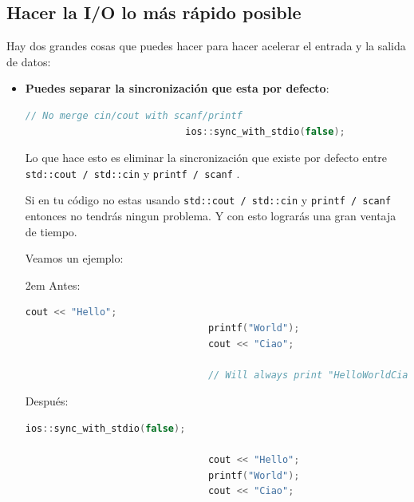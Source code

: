 \documentclass[12pt, fleqn]{report}                             %
\newenvironment{Indentation}[1][0.75em]                         %
        {\begin{adjustwidth}{#1}{}}                                 %
        {\end{adjustwidth}}                                         %
\theoremstyle{break}                                            %
\newcommand{\textCode}[1]  { \texttt{#1} }                      %
\begin{document}
            \subsection{Hacer la I/O lo más rápido posible}

                Hay dos grandes cosas que puedes hacer para hacer acelerar el entrada y la salida
                de datos:
                \begin{itemize}
                    \item \textbf{Puedes separar la sincronización que esta por defecto}:
                        \begin{lstlisting}[language=C++, gobble=28]
                            // No merge cin/cout with scanf/printf
                            ios::sync_with_stdio(false);   
                        \end{lstlisting}

                        Lo que hace esto es eliminar la sincronización que existe por defecto entre 
                        \textCode{std::cout / std::cin} y \textCode{printf / scanf}. 
                        
                        Si en tu código no estas usando \textCode{std::cout / std::cin} y \textCode{printf / scanf}
                        entonces no tendrás ningun problema. Y con esto lograrás una gran ventaja de tiempo.

                        Veamos un ejemplo:

                        \begin{Indentation}[2em] 
                            Antes:
                            \begin{lstlisting}[language=C++, gobble=32]
                                cout << "Hello";
                                printf("World");
                                cout << "Ciao";  

                                // Will always print "HelloWorldCiao"
                            \end{lstlisting}

                            Después:
                            \begin{lstlisting}[language=C++, gobble=32]
                                ios::sync_with_stdio(false);   

                                cout << "Hello";
                                printf("World");
                                cout << "Ciao";  


\end{lstlisting}
\end{Indentation}
\end{itemize}
\end{document}
